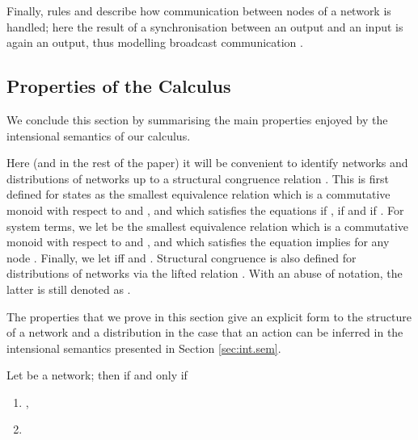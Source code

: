 \documentclass{LMCS}
\begin{document}
Finally, rules  and  describe how communication 
between nodes of a network is handled; here the result of a synchronisation between 
an output and an input is again an output, thus modelling broadcast 
communication \cite{Prasad95}.





\subsection{Properties of the Calculus}
\label{sec:properties}
We conclude this section by summarising the main properties enjoyed by the 
intensional semantics of our calculus.

Here (and in the rest of the paper) 
it will be convenient to identify networks 
and distributions of networks
up to a structural congruence relation . This is first 
defined for states as the smallest equivalence relation which is 
a commutative monoid with 
respect to  and , and which satisfies the equations 
 if , 
 if  and 
 if 
.
For system terms, we let  
be the smallest equivalence relation which is a commutative 
monoid with respect to  and , and which satisfies the 
equation  implies  
for any node . Finally, we let  iff  and . 
Structural congruence is also defined for distributions of 
networks via the lifted relation . 
With an abuse of notation, the latter is still 
denoted as .

The properties that we prove in this section give an explicit 
form to the structure of a network  and 
a distribution  in the case that an action  can be inferred in the intensional semantics 
presented in Section \ref{sec:int.sem}.

\begin{prop}
\label{prop:tau}
Let  be a network; then 
 if and only if 
\begin{enumerate}[label=(\roman*)]
\item ,
\item 
\end{enumerate}
\end{prop}
\end{document}
